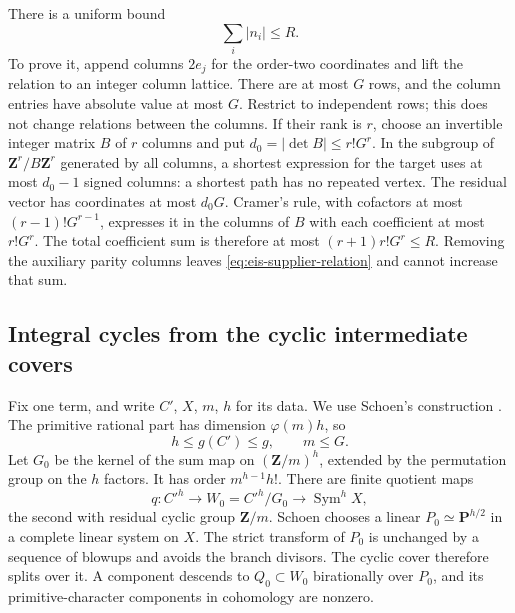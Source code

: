 \documentclass[11pt]{article}
\theoremstyle{definition}
\theoremstyle{remark}
\newcommand{\Z}{\mathbf Z}
\begin{document}
There is a uniform bound
\begin{equation}\label{eq:eis-relation-mass}
 \sum_i|n_i|\le R.
\end{equation}
To prove it, append columns $2e_j$ for the order-two coordinates and
lift the relation to an integer column lattice. There are at most $G$
rows, and the column entries have absolute value at most $G$. Restrict
to independent rows; this does not change relations between the
columns. If their rank is $r$, choose an invertible integer matrix $B$
of $r$ columns and put $d_0=|\det B|\le r!G^r$. In the subgroup of
$\Z^r/B\Z^r$ generated by all columns, a shortest expression for the
target uses at most $d_0-1$ signed columns: a shortest path has no
repeated vertex. The residual vector has coordinates at most $d_0G$.
Cramer's rule, with cofactors at most $(r-1)!G^{r-1}$, expresses it in
the columns of $B$ with each coefficient at most $r!G^r$. The total
coefficient sum is therefore at most $(r+1)r!G^r\le R$. Removing the
auxiliary parity columns leaves \eqref{eq:eis-supplier-relation} and
cannot increase that sum.

\subsection{Integral cycles from the cyclic intermediate covers}

Fix one term, and write $C'$, $X$, $m$, $h$ for its data. We use
Schoen's construction \cite[Theorem~2.0 and Lemmas~2.3--2.6,
pp.~11--17]{Schoen88}. The primitive rational part has dimension
$\varphi(m)h$, so
\[
 h\le g(C')\le g,
 \qquad m\le G.
\]
Let $G_0$ be the kernel of the sum map on $(\Z/m)^h$, extended by
the permutation group on the $h$ factors. It has order
$m^{h-1}h!$. There are finite quotient maps
\[
 q:C'^h\longrightarrow W_0=C'^h/G_0
       \longrightarrow\operatorname{Sym}^hX,
\]
the second with residual cyclic group $\Z/m$. Schoen chooses a linear
$P_0\simeq\mathbf P^{h/2}$ in a complete linear system on $X$. The
strict transform of $P_0$ is unchanged by a sequence of blowups and
avoids the branch divisors. The cyclic cover therefore splits over it.
A component descends to $Q_0\subset W_0$ birationally over $P_0$,
and its primitive-character components in cohomology are nonzero.
\end{document}
